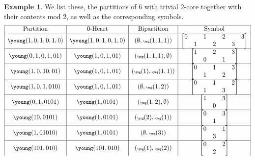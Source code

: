 \documentclass{amsart}
\numberwithin{equation}{section}
\theoremstyle{definition}
\newtheorem{example}[lemma]{Example}%
\begin{document}
\begin{example}
We list these, the partitions of $6$ with trivial $2$-core together with their contents mod $2$, as well as the corresponding symbols.
$$\begin{array}{|c|c|c|c|}\hline
\text{Partition}& \text{$0$-Heart} & \text{Bipartition}& \text{Symbol} \\\hline
{\small \young(1,0,1,0,1,0)} &  {\small \young(1,0,1,0,1,0)} &  ({\tiny \emptyset,\yng(1,1,1)}) &  
 \begin{bmatrix}
0&&1&&2&&3\\&1&&2&&3& 
\end{bmatrix}\\\hline
{\small \young(0,1,0,1,01)}&  {\small \young(1,0,1,01)}&  ({\tiny \yng(1,1,1),\emptyset}) &  \begin{bmatrix}
1&&2&&3\\&0&&1& 
\end{bmatrix}  \\\hline
{\small \young(1,0,10,01)}& {\small \young(1,0,1,01)}&  ({\tiny \yng(1),\yng(1,1)}) &    
\begin{bmatrix}
0&&1&&3\\&1&&2& 
\end{bmatrix} 
\\\hline
{\small \young(1,0,1,010)}&  {\small \young(1,0,1,01)}&  ({\tiny \emptyset,\yng(1,2)}) &  
\begin{bmatrix}
0&&1&&2\\&1&&3& 
\end{bmatrix} \\\hline
{\small \young(0,1,0101)}&  {\small \young(1,0101)}&  ({\tiny \yng(1,2),\emptyset}) &  
\begin{bmatrix}
1&&3\\&0& 
\end{bmatrix}\\\hline
{\small \young(10,0101)}&  {\small \young(1,0101)}& ({\tiny \yng(2),\yng(1)}) &
\begin{bmatrix}
0&&3\\&1& 
\end{bmatrix} \\\hline
{\small \young(1,01010)}&  {\small \young(1,0101)}& (\tiny{\emptyset},\yng(3)) &  \begin{bmatrix}
0&&1\\&3& 
\end{bmatrix} \\\hline
{\small \young(101,010)}&  {\small \young(101,010)}&  ({\tiny \yng(1),\yng(2)}) &  
\begin{bmatrix}
0&&2\\&2& 

\end{bmatrix}
\end{array}$$
\end{example}
\end{document}
